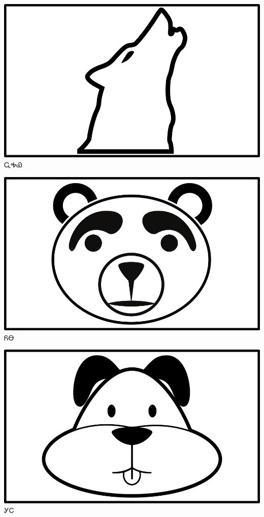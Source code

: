 \documentclass[avery5371]{flashcards}%
\begin{document}
\begin{flashcard}{
\includegraphics[width=0.95\columnwidth,height=.51\columnwidth,keepaspectratio]{../artwork/objects-animate/wahya}
}\Huge ᏩᎭᏯ
\end{flashcard}

\begin{flashcard}{
\includegraphics[width=0.95\columnwidth,height=.51\columnwidth,keepaspectratio]{../artwork/objects-animate/yona}
}\Huge ᏲᎾ
\end{flashcard}

\begin{flashcard}{
\includegraphics[width=0.95\columnwidth,height=.51\columnwidth,keepaspectratio]{../artwork/objects-animate/gihli}
}\Huge ᎩᏟ
\end{flashcard}
\end{document}

